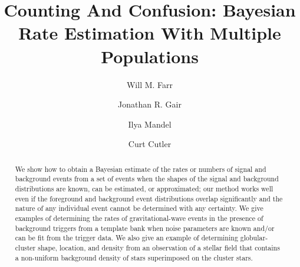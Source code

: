 \documentclass[aps,prd,reprint,nofootinbib]{revtex4-1}
\begin{document}
\title{Counting And Confusion: Bayesian Rate Estimation With Multiple
  Populations}

\author{Will M. Farr} 

\author{Jonathan R. Gair} 

\author{Ilya Mandel} 
 
  
\author{Curt Cutler} 
 



\begin{abstract}
  We show how to obtain a Bayesian estimate of the rates or numbers of
  signal and background events from a set of events when the shapes of
  the signal and background distributions are known, can be estimated,
  or approximated; our method works well even if the foreground and
  background event distributions overlap significantly and the nature
  of any individual event cannot be determined with any certainty.  We
  give examples of determining the rates of gravitational-wave events
  in the presence of background triggers from a template bank when
  noise parameters are known and/or can be fit from the trigger data.
  We also give an example of determining globular-cluster shape,
  location, and density from an observation of a stellar field that
  contains a non-uniform background density of stars superimposed on
  the cluster stars.
\end{abstract}

\maketitle
\end{document}
